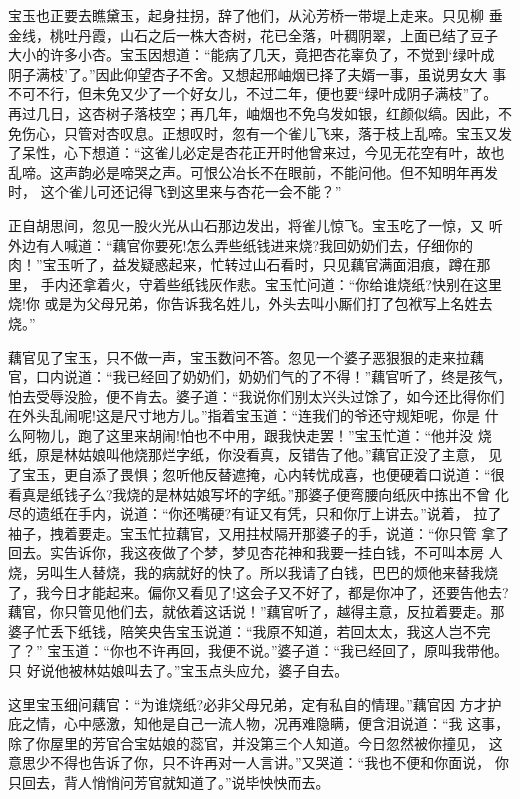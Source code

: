 宝玉也正要去瞧黛玉，起身拄拐，辞了他们，从沁芳桥一带堤上走来。只见柳
垂金线，桃吐丹霞，山石之后一株大杏树，花已全落，叶稠阴翠，上面已结了豆子
大小的许多小杏。宝玉因想道：“能病了几天，竟把杏花辜负了，不觉到‘绿叶成
阴子满枝’了。”因此仰望杏子不舍。又想起邢岫烟已择了夫婿一事，虽说男女大
事不可不行，但未免又少了一个好女儿，不过二年，便也要“绿叶成阴子满枝”了。
再过几日，这杏树子落枝空；再几年，岫烟也不免乌发如银，红颜似缟。因此，不
免伤心，只管对杏叹息。正想叹时，忽有一个雀儿飞来，落于枝上乱啼。宝玉又发
了呆性，心下想道：“这雀儿必定是杏花正开时他曾来过，今见无花空有叶，故也
乱啼。这声韵必是啼哭之声。可恨公冶长不在眼前，不能问他。但不知明年再发时，
这个雀儿可还记得飞到这里来与杏花一会不能？”

正自胡思间，忽见一股火光从山石那边发出，将雀儿惊飞。宝玉吃了一惊，又
听外边有人喊道：“藕官你要死!怎么弄些纸钱进来烧?我回奶奶们去，仔细你的
肉！”宝玉听了，益发疑惑起来，忙转过山石看时，只见藕官满面泪痕，蹲在那里，
手内还拿着火，守着些纸钱灰作悲。宝玉忙问道：“你给谁烧纸?快别在这里烧!你
或是为父母兄弟，你告诉我名姓儿，外头去叫小厮们打了包袱写上名姓去烧。”

藕官见了宝玉，只不做一声，宝玉数问不答。忽见一个婆子恶狠狠的走来拉藕
官，口内说道：“我已经回了奶奶们，奶奶们气的了不得！”藕官听了，终是孩气，
怕去受辱没脸，便不肯去。婆子道：“我说你们别太兴头过馀了，如今还比得你们
在外头乱闹呢!这是尺寸地方儿。”指着宝玉道：“连我们的爷还守规矩呢，你是
什么阿物儿，跑了这里来胡闹!怕也不中用，跟我快走罢！”宝玉忙道：“他并没
烧纸，原是林姑娘叫他烧那烂字纸，你没看真，反错告了他。”藕官正没了主意，
见了宝玉，更自添了畏惧；忽听他反替遮掩，心内转忧成喜，也便硬着口说道：“很
看真是纸钱子么?我烧的是林姑娘写坏的字纸。”那婆子便弯腰向纸灰中拣出不曾
化尽的遗纸在手内，说道：“你还嘴硬?有证又有凭，只和你厅上讲去。”说着，
拉了袖子，拽着要走。宝玉忙拉藕官，又用拄杖隔开那婆子的手，说道：“你只管
拿了回去。实告诉你，我这夜做了个梦，梦见杏花神和我要一挂白钱，不可叫本房
人烧，另叫生人替烧，我的病就好的快了。所以我请了白钱，巴巴的烦他来替我烧
了，我今日才能起来。偏你又看见了!这会子又不好了，都是你冲了，还要告他去?
藕官，你只管见他们去，就依着这话说！”藕官听了，越得主意，反拉着要走。那
婆子忙丢下纸钱，陪笑央告宝玉说道：“我原不知道，若回太太，我这人岂不完了？”
宝玉道：“你也不许再回，我便不说。”婆子道：“我已经回了，原叫我带他。只
好说他被林姑娘叫去了。”宝玉点头应允，婆子自去。

这里宝玉细问藕官：“为谁烧纸?必非父母兄弟，定有私自的情理。”藕官因
方才护庇之情，心中感激，知他是自己一流人物，况再难隐瞒，便含泪说道：“我
这事，除了你屋里的芳官合宝姑娘的蕊官，并没第三个人知道。今日忽然被你撞见，
这意思少不得也告诉了你，只不许再对一人言讲。”又哭道：“我也不便和你面说，
你只回去，背人悄悄问芳官就知道了。”说毕怏怏而去。

